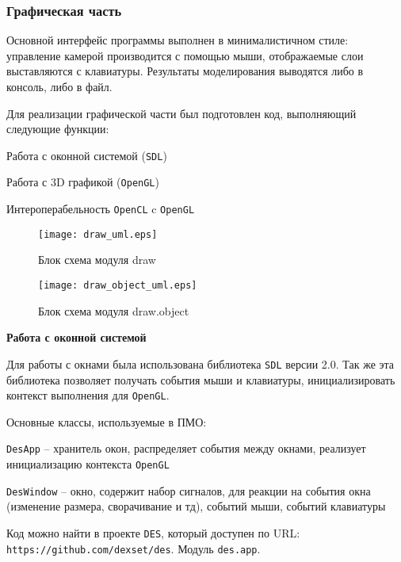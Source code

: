 \newpage
\subsubsection{Графическая часть}

Основной интерфейс программы выполнен в минималистичном стиле:
управление камерой производится с помощью мыши, отображаемые слои выставляются с клавиатуры.
Результаты моделирования выводятся либо в консоль, либо в файл.

Для реализации графической части был подготовлен код,
выполняющий следующие функции:

\begin{mintemize}
\item Работа с оконной системой (\verb|SDL|)
\item Работа с 3D графикой (\verb|OpenGL|)
\item Интероперабельность \verb|OpenCL| c \verb|OpenGL|
\end{mintemize}

\begin{figure}[h!]
    \centering
    \texttt{[image: draw\_uml.eps]}
    \caption{Блок схема модуля draw}
\end{figure}

\begin{figure}[h!]
    \centering
    \texttt{[image: draw\_object\_uml.eps]}
    \caption{Блок схема модуля draw.object}
\end{figure}

\newpage
\textbf{Работа с оконной системой}

Для работы с окнами была использована библиотека \verb|SDL| версии 2.0.
Так же эта библиотека позволяет получать события мыши и клавиатуры,
инициализировать контекст выполнения для \verb|OpenGL|.

Основные классы, используемые в ПМО:
\begin{mintemize}
\item \verb|DesApp| -- хранитель окон, распределяет события между окнами, реализует
    инициализацию контекста \verb|OpenGL|
\item \verb|DesWindow| -- окно, содержит набор сигналов, для реакции на события окна
    (изменение размера, сворачивание и тд), событий мыши, событий клавиатуры
\end{mintemize}

Код можно найти в проекте \verb|DES|, который доступен по
\linebreak URL: \verb|https://github.com/dexset/des|.
Модуль \verb|des.app|.

